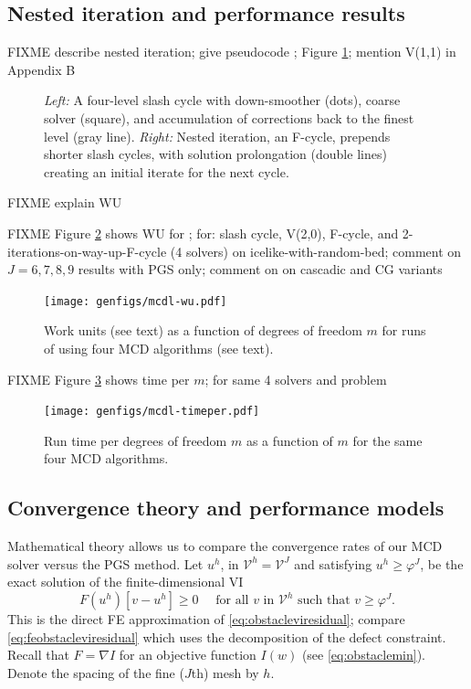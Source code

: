 \documentclass[letterpaper,final,12pt,reqno]{amsart}
\theoremstyle{claim}
\newcommand{\grad}{\nabla}
\numberwithin{equation}{section}
\numberwithin{figure}{section}
\numberwithin{table}{section}
\numberwithin{theorem}{section}
\begin{document}
\subsection*{Nested iteration and performance results} FIXME describe nested iteration; give pseudocode ; Figure \ref{fig:fcycle}; mention V(1,1) in Appendix B

\begin{figure}

\caption{\emph{Left:} A four-level slash cycle with down-smoother (dots), coarse solver (square), and accumulation of corrections back to the finest level (gray line).  \emph{Right:} Nested iteration, an F-cycle, prepends shorter slash cycles, with solution prolongation (double lines) creating an initial iterate for the next cycle.}
\label{fig:fcycle}
\end{figure}

FIXME explain WU

FIXME Figure \ref{fig:mcdl-wu} shows WU for ; for: slash cycle, V(2,0), F-cycle, and 2-iterations-on-way-up-F-cycle (4 solvers) on icelike-with-random-bed; comment on $J=6,7,8,9$ results with PGS only; comment on \cite{Blumetal2004} on cascadic and CG variants

\begin{figure}
\texttt{[image: genfigs/mcdl-wu.pdf]}
\caption{Work units (see text) as a function of degrees of freedom $m$ for runs of  using four MCD algorithms (see text).}
\label{fig:mcdl-wu}
\end{figure}

FIXME Figure \ref{fig:mcdl-timeper} shows time per $m$; for same 4 solvers and problem

\begin{figure}
\texttt{[image: genfigs/mcdl-timeper.pdf]}
\caption{Run time per degrees of freedom $m$ as a function of $m$ for the same four MCD algorithms.}
\label{fig:mcdl-timeper}
\end{figure}

\subsection*{Convergence theory and performance models}  Mathematical theory allows us to compare the convergence rates of our MCD solver versus the PGS method.  Let $u^h$, in $\mathcal{V}^h = \mathcal{V}^J$ and satisfying $u^h \ge \varphi^J$, be the exact solution of the finite-dimensional VI
\begin{equation}
  F(u^h)[v-u^h] \ge 0 \quad \text{ for all } v \text{ in $\mathcal{V}^h$ such that } v \ge \varphi^J. \label{eq:feobstaclevioriginal}
\end{equation}
This is the direct FE approximation of \eqref{eq:obstacleviresidual}; compare \eqref{eq:feobstacleviresidual} which uses the decomposition of the defect constraint.  Recall that $F=\grad I$ for an objective function $I(w)$ (see \eqref{eq:obstaclemin}).  Denote the spacing of the fine ($J$th) mesh by $h$.
\end{document}
